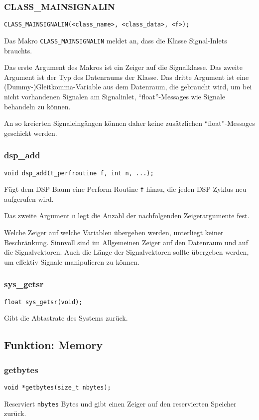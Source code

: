 \documentclass[12pt, a4paper,austrian, titlepage]{article}
\begin{document}
\begin{appendix}
\subsubsection{CLASS\_MAINSIGNALIN}
\begin{verbatim}
CLASS_MAINSIGNALIN(<class_name>, <class_data>, <f>);
\end{verbatim}
Das Makro \verb+CLASS_MAINSIGNALIN+ meldet an, dass die Klasse
Signal-Inlets brauchts.

Das erste Argument des Makros ist ein Zeiger auf die Signalklasse.
Das zweite Argument ist der Typ des Datenraums der Klasse.
Das dritte Argument ist eine (Dummy-)Gleitkomma-Variable aus dem Datenraum,
die gebraucht wird, um bei nicht vorhandenen Signalen am Signalinlet,
``float''-Messages wie Signale behandeln zu können.

An so kreierten Signaleingängen können daher keine zusätzlichen ``float''-Messages
geschickt werden.

\subsubsection{dsp\_add}
\begin{verbatim}
void dsp_add(t_perfroutine f, int n, ...);
\end{verbatim}
Fügt dem DSP-Baum eine Perform-Routine \verb+f+ hinzu,
die jeden DSP-Zyklus neu aufgerufen wird.

Das zweite Argument \verb+n+ legt die Anzahl der nachfolgenden Zeigerargumente fest.

Welche Zeiger auf welche Variablen übergeben werden, unterliegt keiner Beschränkung.
Sinnvoll sind im Allgemeinen Zeiger auf den Datenraum und auf die Signalvektoren.
Auch die Länge der Signalvektoren sollte übergeben werden,
um effektiv Signale manipulieren zu können.

\subsubsection{sys\_getsr}
\begin{verbatim}
float sys_getsr(void);
\end{verbatim}
Gibt die Abtastrate des Systems zurück.

\subsection{Funktion: Memory}
\subsubsection{getbytes}
\begin{verbatim}
void *getbytes(size_t nbytes);
\end{verbatim}
Reserviert \verb+nbytes+ Bytes und gibt einen Zeiger auf den reservierten Speicher zurück.


\end{appendix}
\end{document}
